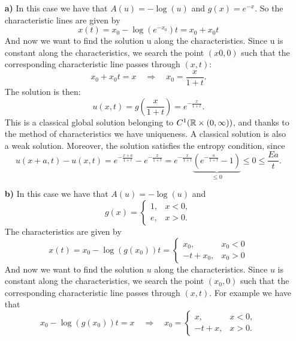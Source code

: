 \begin{itemize}
    \item[\textbf{a)}]
          In this case we have that \(A(u) = -\log(u)\) and \(g(x) = e^{-x}\).
          So the characteristic lines are given by
          \[
              x(t) = x_0 - \log(e^{-x_0})t = x_0 + x_0 t
          \]
          And now we want to find the solution u along the characteristics. Since u is
          constant along the characteristics, we search the point \((x0,0)\) such that
          the corresponding characteristic line passes through \((x,t)\):
          \[
              x_0 + x_0 t = x \quad \Rightarrow \quad x_0 = \frac{x}{1+t}.
          \]
          The solution is then:
          \[
              u(x,t) = g\left(\frac{x}{1+t}\right) = e^{-\frac{x}{1+t}}.
          \]
          This is a classical global solution belonging to \(C^1(\mathbb{R} \times (0,
          \infty))\), and thanks to the method of characteristics we have uniqueness. A
          classical solution is also a weak solution. Moreover, the solution satisfies
          the entropy condition, since
          \[
              u(x+a,t)-u(x,t) = e^{-\frac{x+a}{1+t}} - e^{-\frac{x}{1+t}} = e^{-\frac{x}{1+t}} \underbrace{\left(e^{-\frac{a}{1+t}}-1\right)}_{\leq 0} \leq 0 \leq \frac{Ea}{t}.
          \]
    \item[\textbf{b)}]
          In this case we have that \(A(u) = -\log(u)\) and \[g(x) = \begin{cases}
                  1, & x < 0, \\
                  e, & x > 0.
              \end{cases}\]
          The characteristics are given by
          \[
              x(t) = x_0 - \log(g(x_0))t = \begin{cases}
                  x_0,      & x_0 < 0 \\
                  -t + x_0, & x_0 > 0
              \end{cases}
          \]
          And now we want to find the solution $u$ along the characteristics. Since $u$
          is constant along the characteristics, we search the point \((x_0,0)\) such
          that the corresponding characteristic line passes through \((x,t)\). For
          example we have that
          \[
              x_0 - \log(g(x_0))t = x \quad \Rightarrow \quad x_0 = \begin{cases}
                  x,      & x < 0, \\
                  -t + x, & x > 0.
              \end{cases}
\]
\end{itemize}
